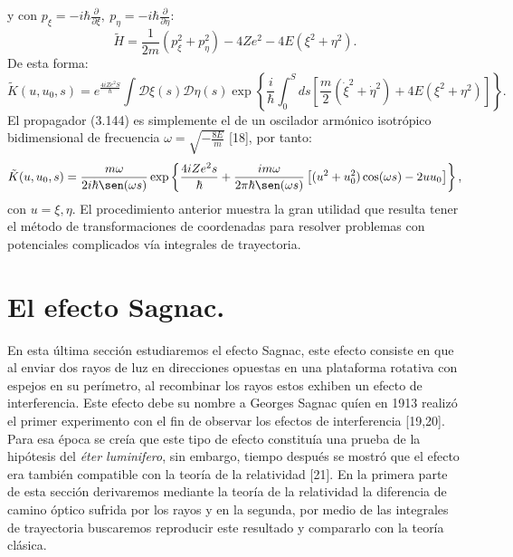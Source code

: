 y con $	p_{\xi}=-i\hbar\frac{\partial}{\partial\xi},\ p_{\eta}=-i\hbar\frac{\partial}{\partial\eta} $:
\begin{equation}
\tilde{H}=\frac{1}{2m}\left(p_{\xi}^{2}+p_{\eta}^{2}\right)-4Ze^{2}-4E(\xi^{2}+\eta^{2}).
\end{equation}
De esta forma:
\begin{equation}
\tilde{K}(u,u_{0},s)=e^{\frac{4iZe^{2}S}{\hbar}}\int\mathcal{D}\xi(s)\mathcal{D}\eta(s)\exp\left\{ \frac{i}{\hbar}\int_{0}^{S}ds\left[\frac{m}{2}(\dot{\xi}^{2}+\dot{\eta}^{2})+4E(\xi^{2}+\eta^{2})\right]\right\} .
\end{equation} 
El propagador (3.144) es simplemente el de un oscilador armónico isotrópico bidimensional de frecuencia $\omega=\sqrt{-\frac{8E}{m}}$ [18], por tanto:
\begin{equation}
\tilde{K}(u,u_{0},s)=\frac{m\omega}{2i\hbar\sen(\omega s)}\exp\left\{ \frac{4iZe^{2}s}{\hbar}+\frac{im\omega}{2\pi\hbar\sen(\omega s)}\left[(u^{2}+u_{0}^{2})\cos(\omega s)-2uu_{0}\right]\right\}, 
\end{equation}
con $u={\xi ,\eta}$. El procedimiento anterior muestra la gran utilidad que resulta tener el método de transformaciones de coordenadas para resolver problemas con potenciales complicados vía integrales de trayectoria.
\newpage






\section{El efecto Sagnac.}
En esta última sección estudiaremos el efecto Sagnac, este efecto consiste en que al enviar dos rayos de luz en  direcciones opuestas en una plataforma rotativa con espejos en su perímetro, al recombinar los rayos estos exhiben un efecto de interferencia. Este efecto debe su nombre a Georges Sagnac quíen en 1913 realizó el primer experimento con el fin de observar los efectos de interferencia [19,20]. Para esa época se creía que este tipo de efecto constituía una prueba de la hipótesis del \textit{éter luminifero}, sin embargo, tiempo después se mostró que el efecto era también compatible con la teoría de la relatividad [21]. En la primera parte de esta sección derivaremos mediante la teoría de la relatividad la diferencia de camino óptico sufrida por los rayos y en la segunda, por medio de las integrales de trayectoria buscaremos reproducir este resultado y compararlo con la teoría clásica.
	 
